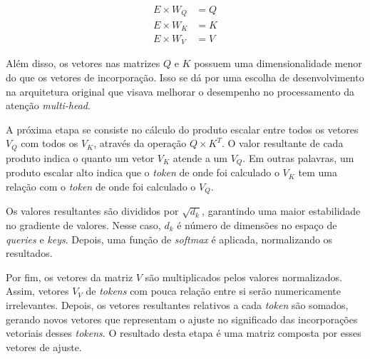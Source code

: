 \begin{align*}
      E \times W_Q & = Q \\
      E \times W_K & = K \\
      E \times W_V & = V
\end{align*}

Além disso, os vetores nas matrizes \begin{math}Q\end{math} e \begin{math}K\end{math} possuem uma dimensionalidade menor do que os vetores de incorporação. Isso se dá
por uma escolha de desenvolvimento na arquitetura original que visava melhorar o desempenho no processamento da atenção \textit{multi-head}.

A próxima etapa se consiste no cálculo do produto escalar entre todos os vetores \begin{math}V_Q\end{math} com todos os \begin{math}V_K\end{math}, através da operação
\begin{math}Q \times K^T\end{math}. O valor resultante de cada produto indica o quanto um vetor \begin{math}V_K\end{math} atende a um \begin{math}V_Q\end{math}. Em
outras palavras, um produto escalar alto indica que o \textit{token} de onde foi calculado o \begin{math}V_K\end{math} tem uma relação com o \textit{token} de
onde foi calculado o \begin{math}V_Q\end{math}.

Os valores resultantes são divididos por \begin{math}\sqrt{d_k}\end{math}, garantindo uma maior estabilidade no gradiente de valores. Nesse caso,
\begin{math}d_k\end{math} é número de dimensões no espaço de \textit{queries} e \textit{keys}. Depois, uma função de \textit{softmax} é aplicada, normalizando os
resultados.

Por fim, os vetores da matriz \begin{math}V\end{math} são multiplicados pelos valores normalizados. Assim, vetores \begin{math}V_V\end{math} de \textit{tokens} com pouca
relação entre si serão numericamente irrelevantes. Depois, os vetores resultantes relativos a cada \textit{token} são somados, gerando novos vetores que representam o
ajuste no significado das incorporações vetoriais desses \textit{tokens}. O resultado desta etapa é uma matriz composta por esses vetores de ajuste.

